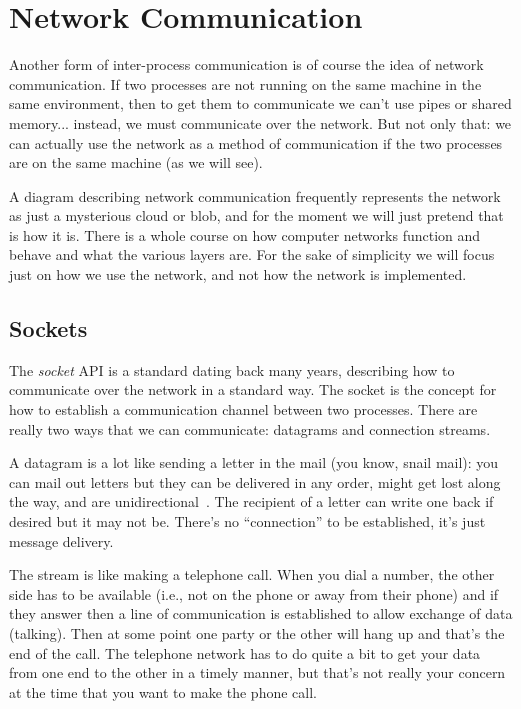 




\section*{Network Communication}

Another form of inter-process communication is of course the idea of network communication. If two processes are not running on the same machine in the same environment, then to get them to communicate we can't use pipes or shared memory... instead, we must communicate over the network. But not only that: we can actually use the network as a method of communication if the two processes are on the same machine (as we will see).

A diagram describing network communication frequently represents the network as just a mysterious cloud or blob, and for the moment we will just pretend that is how it is. There is a whole course on how computer networks function and behave and what the various layers are. For the sake of simplicity we will focus just on how we use the network, and not how the network is implemented.

\subsection*{Sockets}

The \textit{socket} API is a standard dating back many years, describing how to communicate over the network in a standard way. The socket is the concept for how to establish a communication channel between two processes. There are really two ways that we can communicate: datagrams and connection streams.

A datagram is a lot like sending a letter in the mail (you know, snail mail): you can mail out letters but they can be delivered in any order, might get lost along the way, and are unidirectional~\cite{apunix}. The recipient of a letter can write one back if desired but it may not be. There's no ``connection'' to be established, it's just message delivery.

The stream is like making a telephone call. When you dial a number, the other side has to be available (i.e., not on the phone or away from their phone) and if they answer then a line of communication is established to allow exchange of data (talking). Then at some point one party or the other will hang up and that's the end of the call. The telephone network has to do quite a bit to get your data from one end to the other in a timely manner, but that's not really your concern at the time that you want to make the phone call.

